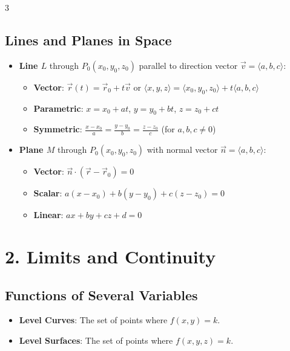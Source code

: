 \documentclass[10pt,landscape,a4paper]{article}
\begin{document}
\begin{multicols*}{3}
\subsection{Lines and Planes in Space}
\begin{itemize}
    \item \textbf{Line $L$} through $P_0(x_0, y_0, z_0)$ parallel to direction vector $\vec{v} = \langle a, b, c \rangle$:
    \begin{itemize}
        \item \textbf{Vector}: $\vec{r}(t) = \vec{r}_0 + t\vec{v}$ or $\langle x,y,z \rangle = \langle x_0,y_0,z_0 \rangle + t\langle a,b,c \rangle$
        \item \textbf{Parametric}: $x = x_0 + at$, $y = y_0 + bt$, $z = z_0 + ct$
        \item \textbf{Symmetric}: $\frac{x-x_0}{a} = \frac{y-y_0}{b} = \frac{z-z_0}{c}$ (for $a,b,c \neq 0$)
    \end{itemize}
    \item \textbf{Plane $M$} through $P_0(x_0, y_0, z_0)$ with normal vector $\vec{n} = \langle a, b, c \rangle$:
    \begin{itemize}
        \item \textbf{Vector}: $\vec{n} \cdot (\vec{r} - \vec{r}_0) = 0$
        \item \textbf{Scalar}: $a(x-x_0) + b(y-y_0) + c(z-z_0) = 0$
        \item \textbf{Linear}: $ax + by + cz + d = 0$
    \end{itemize}
\end{itemize}

\section{2. Limits and Continuity}
\subsection{Functions of Several Variables}
\begin{itemize}
    \item \textbf{Level Curves}: The set of points where $f(x,y) = k$.
    \item \textbf{Level Surfaces}: The set of points where $f(x,y,z) = k$.
\end{itemize}


\end{multicols*}
\end{document}
